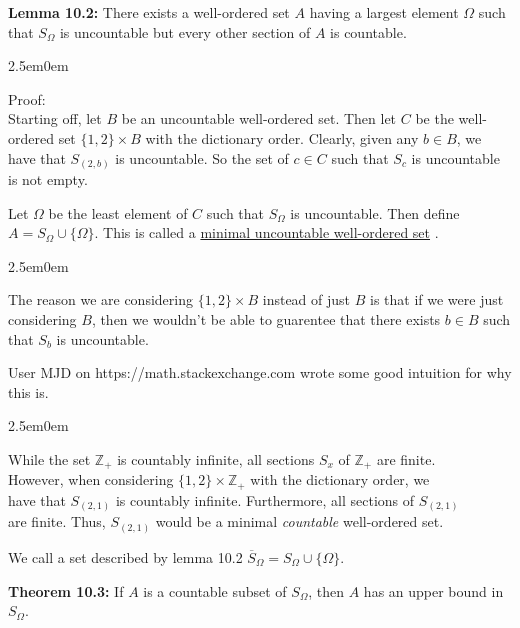 \documentclass{book}
\newcommand{\hTwo}{%
\color{Black}%
   \fontsize{13}{15}\selectfont%
}
\newcommand{\myComment}{%
   \color{RawerSienna}%
   \fontsize{12}{14}\selectfont%
}
\newenvironment{myIndent}{%
   \begin{adjustwidth}{2.5em}{0em}%
}{%
   \end{adjustwidth}%
}
\newcommand{\udefine}[1]{{%
   \setulcolor{Red}%
   \setul{0.14em}{0.07em}%
   \ul{#1}%
}}
\newcommand{\blab}[1]{\textbf{#1}}
\newcommand{\retTwo}{\hfill\bigbreak}
\begin{document}
   \blab{Lemma 10.2:} There exists a well-ordered set $A$ having a largest element $\Omega$ such that $S_\Omega$ is uncountable but every other section of $A$ is countable.

   \begin{myIndent}\hTwo
      Proof:\\
      Starting off, let $B$ be an uncountable well-ordered set. Then let $C$ be the well-\\ordered set $\{1, 2\} \times B$ with the dictionary order. Clearly, given any $b \in B$, we have that $S_{(2, b)}$ is uncountable. So the set of $c \in C$ such that $S_c$ is uncountable is not empty.\retTwo

      Let $\Omega$ be the least element of $C$ such that $S_\Omega$ is uncountable. Then define\\ $A = S_\Omega \cup \{\Omega\}$. This is called a \udefine{minimal uncountable well-ordered set}.
      \retTwo
      
      \begin{myIndent}\myComment
         The reason we are considering $\{1, 2\} \times B$ instead of just $B$ is that if we were just considering $B$, then we wouldn't be able to guarentee that there exists $b \in B$ such that $S_b$ is uncountable.\newpage

         User MJD on https://math.stackexchange.com wrote some good intuition for why\\ this is.
         \begin{myIndent}
            While the set $\mathbb{Z}_+$ is countably infinite, all sections $S_x$ of $\mathbb{Z}_+$ are finite.\\ However, when considering $\{1, 2\} \times \mathbb{Z}_+$ with the dictionary order, we\\ have that $S_{(2, 1)}$ is countably infinite. Furthermore, all sections of $S_{(2, 1)}$\\ are finite. Thus, $S_{(2, 1)}$ would be a minimal \textit{countable} well-ordered set.\retTwo
         \end{myIndent}
      \end{myIndent}
   \end{myIndent}

   We call a set described by lemma 10.2 $\overline{S}_\Omega = S_\Omega \cup \{\Omega\}$.\retTwo

   \blab{Theorem 10.3:} If $A$ is a countable subset of $S_\Omega$, then $A$ has an upper bound in $S_\Omega$.
   
\end{document}
